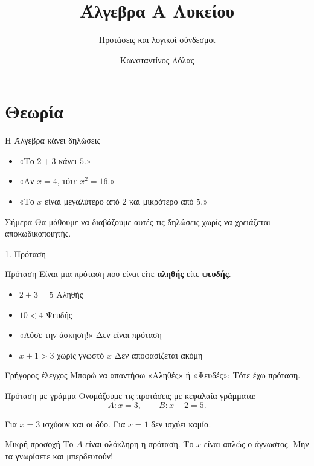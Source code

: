 \documentclass{presentation}
\title{Άλγεβρα Α Λυκείου}
\subtitle{Προτάσεις και λογικοί σύνδεσμοι}
\author[Λόλας]{Κωνσταντίνος Λόλας}
\institute[$10^ο$ ΓΕΛ]{$10^ο$ ΓΕΛ Θεσσαλονίκης}
\begin{document}
\begin{frame}
  \titlepage
\end{frame}

\section{Θεωρία}

\begin{frame}{Η Άλγεβρα κάνει δηλώσεις}
  \begin{itemize}[<+->]
    \item «Το $2+3$ κάνει $5$.»
    \item «Αν $x=4$, τότε $x^2=16$.»
    \item «Το $x$ είναι μεγαλύτερο από $2$ και μικρότερο από $5$.»
  \end{itemize}

  \begin{exampleblock}{Σήμερα}
    Θα μάθουμε να διαβάζουμε αυτές τις δηλώσεις χωρίς να χρειάζεται
    αποκωδικοποιητής.
  \end{exampleblock}
\end{frame}

\begin{frame}{1. Πρόταση}
  \begin{block}{Πρόταση}
    Είναι μια πρόταση που είναι είτε \textbf{αληθής} είτε \textbf{ψευδής}.
  \end{block}

  \begin{itemize}[<+->]
    \item $2+3=5$ \hfill Αληθής
    \item $10<4$ \hfill Ψευδής
    \item «Λύσε την άσκηση!» \hfill Δεν είναι πρόταση
    \item $x+1>3$ χωρίς γνωστό $x$ \hfill Δεν αποφασίζεται ακόμη
  \end{itemize}

  \begin{alertblock}{Γρήγορος έλεγχος}
    Μπορώ να απαντήσω «Αληθές» ή «Ψευδές»; Τότε έχω πρόταση.
  \end{alertblock}
\end{frame}

\begin{frame}{Πρόταση με γράμμα}
  Ονομάζουμε τις προτάσεις με κεφαλαία γράμματα:
  \[
    A: x=3, \qquad B: x+2=5.
  \]

  Για $x=3$ ισχύουν και οι δύο. Για $x=1$ δεν ισχύει καμία.

  \begin{exampleblock}{Μικρή προσοχή}
    Το $A$ είναι ολόκληρη η πρόταση. Το $x$ είναι απλώς ο άγνωστος.
    Μην τα γνωρίσετε και μπερδευτούν!
  \end{exampleblock}
\end{frame}
\end{document}
